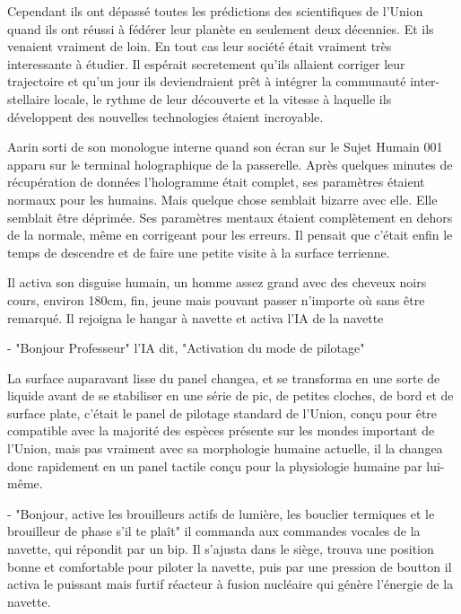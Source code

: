 \documentclass[12pt,hidelinks,a4paper]{book}
\begin{document}
Cependant ils ont dépassé toutes les prédictions des scientifiques de l'Union quand ils ont réussi à fédérer leur planète 
en seulement deux décennies. Et ils venaient vraiment de loin. En tout cas leur société était vraiment très interessante 
à étudier. Il espérait secretement qu'ils allaient corriger leur trajectoire et qu'un jour ils deviendraient prêt à intégrer
la communauté inter-stellaire locale, le rythme de leur découverte et la vitesse à laquelle ils développent des nouvelles 
technologies étaient incroyable.\par 
\bigskip

Aarin sorti de son monologue interne quand son écran sur le Sujet Humain 001 apparu sur le terminal holographique de la 
passerelle. Après quelques minutes de récupération de données l'hologramme était complet, ses paramètres étaient normaux pour 
les humains. Mais quelque chose semblait bizarre avec elle. Elle semblait être déprimée. Ses paramètres mentaux étaient 
complètement en dehors de la normale, même en corrigeant pour les erreurs. Il pensait que c'était enfin le temps de descendre 
et de faire une petite visite à la surface terrienne.\par 
\bigskip 

Il activa son \gls{disguise} humain, un homme assez grand avec des cheveux noirs cours, environ 180cm, fin, 
jeune mais pouvant passer n'importe où sans être remarqué. Il rejoigna le hangar à navette et activa l'IA de la navette\par 
\bigskip

- "Bonjour Professeur" l'IA dit, "Activation du mode de pilotage"\par 
\bigskip 
La surface auparavant lisse du panel changea, et se transforma en une sorte de liquide avant de 
se stabiliser en une série de pic, de petites cloches, de bord et de surface plate, c'était le panel de pilotage 
standard de l'Union, conçu pour être compatible avec la majorité des espèces présente sur les mondes important de 
l'Union, mais pas vraiment avec sa morphologie humaine actuelle, il la changea donc rapidement en un panel tactile
conçu pour la physiologie humaine par lui-même.\par 
\bigskip

- "Bonjour, active les brouilleurs actifs de lumière, les bouclier termiques et le brouilleur de phase s'il te plaît"
il commanda aux commandes vocales de la navette, qui répondit par un bip. 
Il s'ajusta dans le siège, trouva une position bonne et comfortable pour piloter la navette, puis par une pression de boutton
il activa le puissant mais furtif réacteur à fusion nucléaire qui génère l'énergie de la navette.\par 
\bigskip
\end{document}

